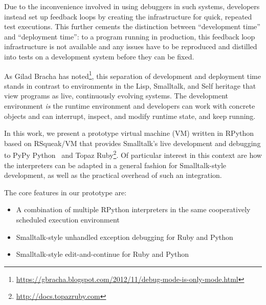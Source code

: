 \documentclass[10pt,numbers]{sigplanconf}
\begin{document}
Due to the inconvenience involved in using debuggers in such systems, developers
instead set up feedback loops by creating the infrastructure for quick, repeated
test executions. This further cements the distinction between ``development
time'' and ``deployment time'': to a program running in production, this
feedback loop infrastructure is not available and any issues have to be
reproduced and distilled into tests on a development system before they can be
fixed.

As Gilad Bracha has
noted\footnote{\url{https://gbracha.blogspot.com/2012/11/debug-mode-is-only-mode.html}},
this separation of development and deployment time stands in contrast to
environments in the Lisp, Smalltalk, and Self heritage that view programs as
live, continuously evolving systems. The development environment \emph{is} the
runtime environment and developers can work with concrete objects and can
interrupt, inspect, and modify runtime state, and keep running.

In this work, we present a prototype virtual machine (VM) written in
RPython~\cite{Ancona:2007:RST:1297081.1297091} based on
RSqueak/VM%
that provides Smalltalk's
live development and debugging to PyPy
Python~\cite{Rigo:2006:PAV:1176617.1176753} and Topaz
Ruby\footnote{\url{http://docs.topazruby.com}}. Of particular interest in this context
are how the interpreters can be adapted in a general fashion for Smalltalk-style
development, as well as the practical overhead of such an integration.

The core features in our prototype are:
\begin{itemize}
\item A combination of multiple RPython interpreters in the same cooperatively
  scheduled execution environment
\item Smalltalk-style unhandled exception debugging for Ruby and Python
\item Smalltalk-style edit-and-continue for Ruby and Python
\end{itemize}

\end{document}
